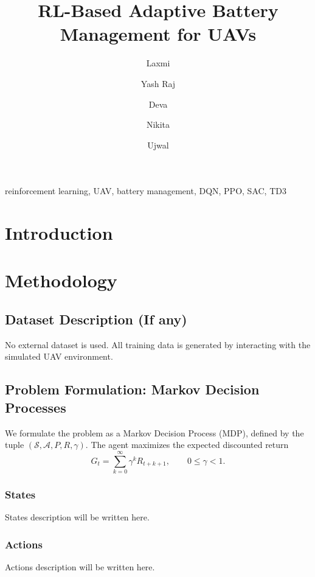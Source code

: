 \documentclass{rlreport}
\begin{document}
\title{RL-Based Adaptive Battery Management for UAVs}

\author{Laxmi \and Yash Raj \and Deva \and Nikita \and Ujwal}

\maketitle

\begin{abstract}

\end{abstract}

\begin{keywords}
reinforcement learning, UAV, battery management, DQN, PPO, SAC, TD3
\end{keywords}

\section{Introduction}


\section{Methodology}

\subsection{Dataset Description (If any)}
No external dataset is used. All training data is generated by interacting with the simulated UAV environment.

\subsection{Problem Formulation: Markov Decision Processes}
\label{sec:mdp}
We formulate the problem as a Markov Decision Process (MDP), defined by the tuple $(\mathcal{S}, \mathcal{A}, P, R, \gamma)$. The agent maximizes the expected discounted return
\begin{equation}
  G_t = \sum_{k=0}^{\infty} \gamma^{k} R_{t+k+1}, \qquad 0 \le \gamma < 1.
  \label{eq:return}
\end{equation}

\subsubsection{States}
States description will be written here.

\subsubsection{Actions}
Actions description will be written here.
\end{document}
